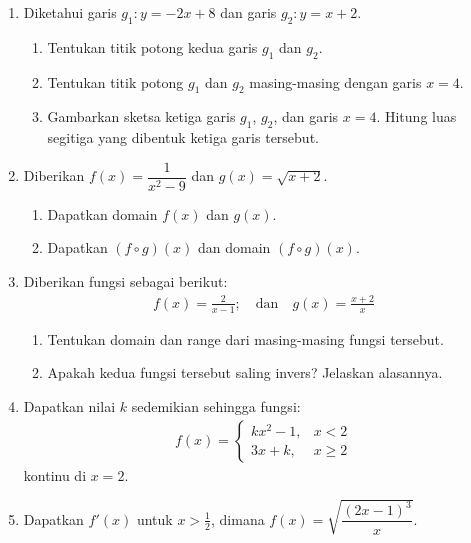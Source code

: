 \documentclass[10pt,openany,a4paper]{article}
\theoremstyle{definition}
\theoremstyle{definition}
\theoremstyle{plain}
\begin{document}
\newpage

\begin{enumerate}
    \item Diketahui garis $g_1: y=-2x+8$ dan garis $g_2: y=x+2$.
    \begin{enumerate}
        \item Tentukan titik potong kedua garis $g_1$ dan $g_2$.
        \item Tentukan titik potong $g_1$ dan $g_2$ masing-masing dengan garis $x=4$.
        \item Gambarkan sketsa ketiga garis $g_1$, $g_2$, dan garis $x=4$. Hitung luas segitiga yang dibentuk ketiga garis tersebut.
    \end{enumerate}

    \item Diberikan $f(x)=\dfrac{1}{x^2-9}$ dan $g(x)=\sqrt{x+2}$.
    \begin{enumerate}
        \item Dapatkan domain $f(x)$ dan $g(x)$.
        \item Dapatkan $(f\circ g)(x)$ dan domain $(f\circ g)(x)$.
    \end{enumerate}

    \item Diberikan fungsi sebagai berikut:
    \begin{align*}
        f(x)=\frac{2}{x-1};\quad \text{dan}\quad g(x)=\frac{x+2}{x}
    \end{align*}
    \begin{enumerate}
        \item Tentukan domain dan range dari masing-masing fungsi tersebut.
        \item Apakah kedua fungsi tersebut saling invers? Jelaskan alasannya.
    \end{enumerate}

    \item Dapatkan nilai $k$ sedemikian sehingga fungsi:
    \begin{align*}
        f(x)=\begin{cases}
            kx^2-1, & x<2\\
            3x+k, & x\geq 2
        \end{cases}
    \end{align*}
    kontinu di $x=2$.

    \item Dapatkan $f'(x)$ untuk $x>\frac{1}{2}$, dimana $f(x)=\sqrt{\dfrac{(2x-1)^3}{x}}$.
\end{enumerate}
\end{document}
